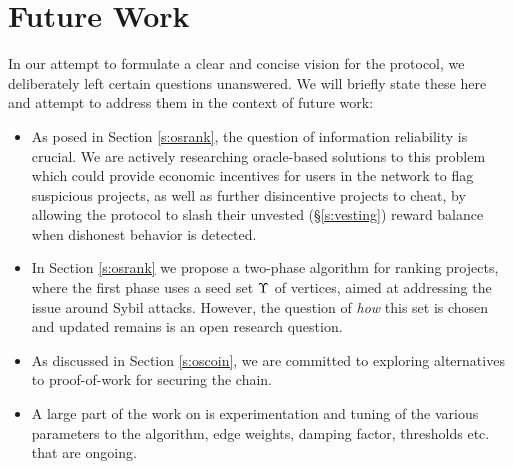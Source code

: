 \section{Future Work}
\label{s:future-work}

In our attempt to formulate a clear and concise vision for the \oscoin{}
protocol, we deliberately left certain questions unanswered. We will
briefly state these here and attempt to address them in the context of future work:

\begin{itemize}
\item As posed in Section \ref{s:osrank}, the question of information
reliability is crucial.  We are actively researching oracle-based solutions to
this problem which could provide economic incentives for users in the network
to flag suspicious projects, as well as further disincentive projects to cheat,
by allowing the protocol to slash their unvested (\S\ref{s:vesting}) reward
balance when dishonest behavior is detected.

\item In Section \ref{s:osrank} we propose a two-phase \osrank{} algorithm for
ranking projects, where the first phase uses a seed set $\Upsilon$ of vertices,
aimed at addressing the issue around Sybil attacks.  However, the question of
\emph{how} this set is chosen and updated remains is an open research question.

\item As discussed in Section \ref{s:oscoin}, we are committed to exploring
alternatives to proof-of-work for securing the chain.

\item A large part of the work on \osrank{} is experimentation and tuning of the
various parameters to the algorithm, \eg edge weights, damping factor, thresholds
etc. that are ongoing.
\end{itemize}
